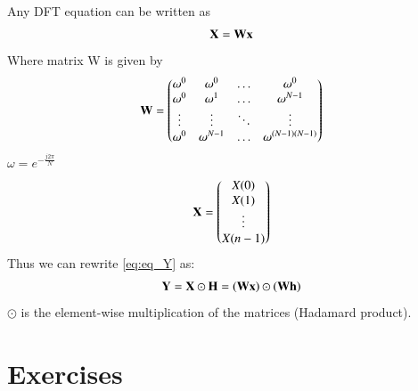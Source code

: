 \documentclass[journal,12pt,twocolumn]{IEEEtran}
\theoremstyle{remark}
\begin{document}
\begin{enumerate}[label=\thesection.\arabic*]
\solution
Any DFT equation can be written as
\begin{align}
    \mathbf{X} = \mathbf{W}\mathbf{x}
\end{align}
Where matrix W is given by 
\begin{align}
	\mathbf{W} = 
	\begin{pmatrix}
		\omega^0 & \omega^0 & \ldots & \omega^0 \\
		\omega^0 & \omega^1 & \ldots & \omega^{N - 1} \\
		\vdots & \vdots & \ddots & \vdots \\
		\omega^0 & \omega^{N - 1} & \ldots & \omega^{(N -1)(N - 1)}
	\end{pmatrix}
\end{align}
 $\omega=e^{-\frac{j2\pi}{N}}$ 
 \begin{align}
	\mathbf{X} = 
	\begin{pmatrix}
		X(0) \\ X(1) \\ \vdots \\ X(n - 1)
	\end{pmatrix}
\end{align}
Thus we can rewrite  \eqref{eq:eq_Y} as:
\begin{align}
	\mathbf{Y} = \mathbf{X}\odot\mathbf{H} = \left(\mathbf{W}\mathbf{x}\right)\odot\left(\mathbf{W}\mathbf{h}\right)
\end{align}
$\odot$ is the element-wise multiplication of the matrices (Hadamard product).

\end{enumerate}
%
\section{Exercises}
\end{document}
